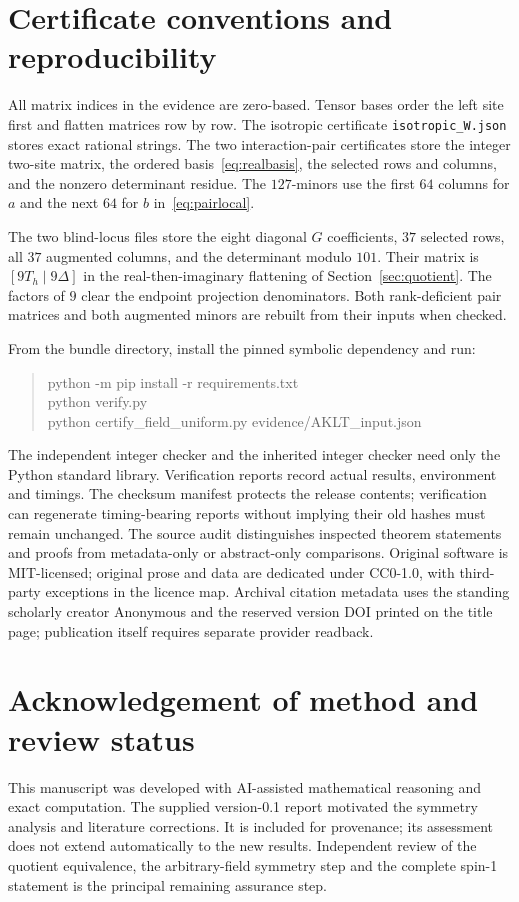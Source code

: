 \documentclass[11pt,a4paper]{article}
\numberwithin{equation}{section}
\theoremstyle{definition}\newtheorem{definition}[theorem]{Definition}
\theoremstyle{remark}\newtheorem{remark}[theorem]{Remark}
\begin{document}
\section{Certificate conventions and reproducibility}\label{app:certs}

All matrix indices in the evidence are zero-based. Tensor bases order the left site first and flatten matrices row by row. The isotropic certificate \texttt{isotropic\_W.json} stores exact rational strings. The two interaction-pair certificates store the integer two-site matrix, the ordered basis~\eqref{eq:realbasis}, the selected rows and columns, and the nonzero determinant residue. The $127$-minors use the first $64$ columns for $a$ and the next $64$ for $b$ in~\eqref{eq:pairlocal}.

The two blind-locus files store the eight diagonal $G$ coefficients, $37$ selected rows, all $37$ augmented columns, and the determinant modulo $101$. Their matrix is $[9T_h\mid9\Delta]$ in the real-then-imaginary flattening of Section~\ref{sec:quotient}. The factors of $9$ clear the endpoint projection denominators. Both rank-deficient pair matrices and both augmented minors are rebuilt from their inputs when checked.

From the bundle directory, install the pinned symbolic dependency and run:
\begin{quote}\ttfamily
python -m pip install -r requirements.txt\\
python verify.py\\
python certify\_field\_uniform.py evidence/AKLT\_input.json
\end{quote}
The independent integer checker and the inherited integer checker need only the Python standard library. Verification reports record actual results, environment and timings. The checksum manifest protects the release contents; verification can regenerate timing-bearing reports without implying their old hashes must remain unchanged. The source audit distinguishes inspected theorem statements and proofs from metadata-only or abstract-only comparisons. Original software is MIT-licensed; original prose and data are dedicated under CC0-1.0, with third-party exceptions in the licence map. Archival citation metadata uses the standing scholarly creator Anonymous and the reserved version DOI printed on the title page; publication itself requires separate provider readback.

\section*{Acknowledgement of method and review status}
This manuscript was developed with AI-assisted mathematical reasoning and exact computation. The supplied version-0.1 report motivated the symmetry analysis and literature corrections. It is included for provenance; its assessment does not extend automatically to the new results. Independent review of the quotient equivalence, the arbitrary-field symmetry step and the complete spin-1 statement is the principal remaining assurance step.
\end{document}
